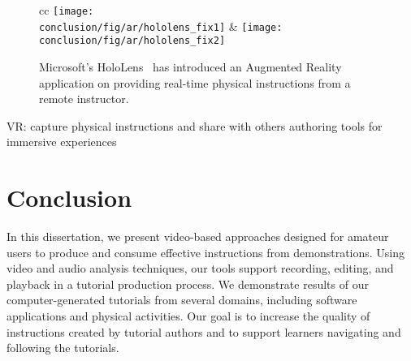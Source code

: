 \begin{figure*}[ht!]
  \centering
\begin{tabular}{cc}
  \texttt{[image: \\conclusion/fig/ar/hololens\_fix1]} &
  \texttt{[image: \\conclusion/fig/ar/hololens\_fix2]} \\
\end{tabular}
\caption{
  Microsoft's HoloLens~\cite{MicrosoftHoloLensSkype} has introduced an Augmented Reality application on providing real-time physical instructions from a remote instructor.
}
\end{figure*}

VR: capture physical instructions and share with others
authoring tools for immersive experiences

\section{Conclusion}
In this dissertation, we present video-based approaches designed for amateur users to produce and consume effective instructions from demonstrations. Using video and audio analysis techniques, our tools support recording, editing, and playback in a tutorial production process. We demonstrate results of our computer-generated tutorials from several domains, including software applications and physical activities. Our goal is to increase the quality of instructions created by tutorial authors and to support learners navigating and following the tutorials.
